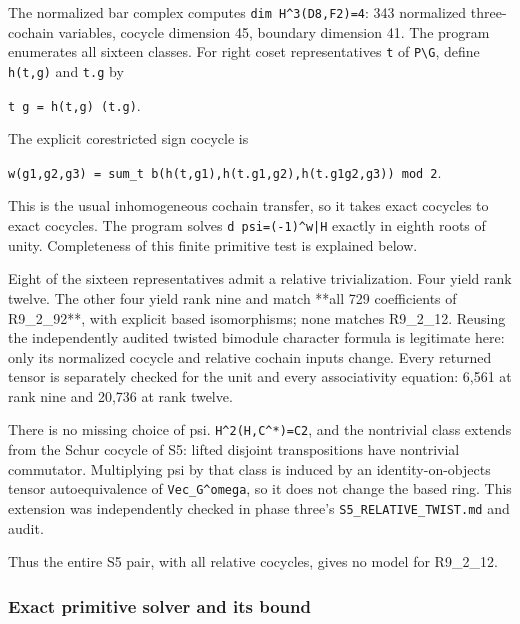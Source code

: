 The normalized bar complex computes
\texttt{dim H\textasciicircum{}\allowbreak{}3(D8,F\allowbreak{}2)=4}:
343 normalized three-cochain variables, cocycle dimension 45, boundary
dimension 41. The program enumerates all sixteen classes. For right
coset representatives \texttt{t} of \texttt{P\textbackslash{}G}, define
\texttt{h(t,g)\allowbreak{}} and \texttt{t.\allowbreak{}g} by

\texttt{t g = \allowbreak{}h(t,g)\allowbreak{} (t.\allowbreak{}g)}.

The explicit corestricted sign cocycle is

\texttt{w(g1,g\allowbreak{}2,g3) \allowbreak{}= sum\_\allowbreak{}t b(h(\allowbreak{}t,g1),\allowbreak{}h(t.\allowbreak{}g1,g2)\allowbreak{},h(t.\allowbreak{}g1g2,g\allowbreak{}3)) mo\allowbreak{}d 2}.

This is the usual inhomogeneous cochain transfer, so it takes exact
cocycles to exact cocycles. The program solves
\texttt{d psi=\allowbreak{}(-\allowbreak{}1)\textasciicircum{}w|H\allowbreak{}}
exactly in eighth roots of unity. Completeness of this finite primitive
test is explained below.

Eight of the sixteen representatives admit a relative trivialization.
Four yield rank twelve. The other four yield rank nine and match **all
729 coefficients of R9\_2\_92**, with explicit based isomorphisms; none
matches R9\_2\_12. Reusing the independently audited twisted bimodule
character formula is legitimate here: only its normalized cocycle and
relative cochain inputs change. Every returned tensor is separately
checked for the unit and every associativity equation: 6,561 at rank
nine and 20,736 at rank twelve.

There is no missing choice of psi.
\texttt{H\textasciicircum{}2(H,\allowbreak{}C\textasciicircum{}*)=C\allowbreak{}2},
and the nontrivial class extends from the Schur cocycle of S5: lifted
disjoint transpositions have nontrivial commutator. Multiplying psi by
that class is induced by an identity-on-objects tensor autoequivalence
of \texttt{Vec\_\allowbreak{}G\textasciicircum{}omeg\allowbreak{}a}, so
it does not change the based ring. This extension was independently
checked in phase three's
\texttt{S5\_\allowbreak{}RELATI\allowbreak{}VE\_\allowbreak{}TWIST.\allowbreak{}md}
and audit.

Thus the entire S5 pair, with all relative cocycles, gives no model for
R9\_2\_12.

\hypertarget{exact-primitive-solver-and-its-bound}{%
\subsubsection{Exact primitive solver and its
bound}\label{exact-primitive-solver-and-its-bound}}

